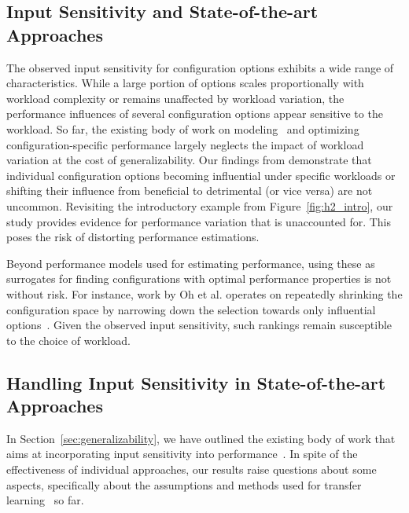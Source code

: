 {{{\subsection{Input Sensitivity and State-of-the-art Approaches}
The observed input sensitivity for configuration options exhibits a wide range of characteristics. While a large portion of options scales proportionally with workload complexity or remains unaffected by workload variation, the performance influences of several configuration options appear sensitive to the workload.  So far, the existing body of work on modeling~\cite{dorn2020,siegmundPerformanceinfluenceModelsHighly2015,haDeepPerf2019,perfAL,guoVariabilityawarePerformancePrediction2013,sarkarCostEfficientSamplingPerformance,guo_2018_data,fourier_learning_2015,perLasso} and optimizing~\cite{chen_mmo_2021,nairUsingBadLearners2017,nairFlash18,ohFindingNearoptimalConfigurations2017} configuration-specific performance largely neglects the impact of workload variation at the cost of generalizability. 
Our findings from  demonstrate that individual configuration options becoming influential under specific workloads or shifting their influence from beneficial to detrimental (or vice versa) are not uncommon. Revisiting the introductory example from Figure~\ref{fig:h2_intro}, our study provides evidence for performance variation that is unaccounted for. This poses the risk of distorting performance estimations.

Beyond performance models used for estimating performance, using these as surrogates for finding configurations with optimal performance properties is not without risk. For instance, work by Oh et al. operates on repeatedly shrinking the configuration space by narrowing down the selection towards only influential options~\cite{ohFindingNearoptimalConfigurations2017}. Given the observed input sensitivity, such rankings remain susceptible to the choice of workload.



\subsection{Handling Input Sensitivity in State-of-the-art Approaches}
In Section~\ref{sec:generalizability}, we have outlined the existing body of work that aims at incorporating input sensitivity into performance~\cite{koc_satune_2021,jamishidi_transfer_2017,jamshidi_learning_2018,jamshidi_transfer_gp_2017}. In spite of the effectiveness of individual approaches, our results raise questions about some aspects, specifically about the assumptions and methods used for transfer learning~\cite{jamshidi_learning_2018,jamishidi_transfer_2017} so far. 

}}}
